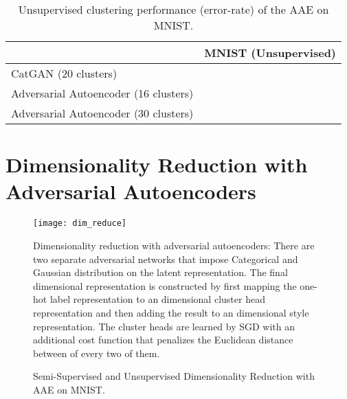 \documentclass{article}
\begin{document}
\begin{center}
\begin{table}[t]
\small
\centering \begin{tabular}{ l  || c}
  \hline
  & MNIST (Unsupervised)\\
  \hline

  CatGAN \citep{catgan}(20 clusters) &   \\  
  Adversarial Autoencoder (16 clusters) &  \\
  Adversarial Autoencoder (30 clusters) &  \\
  \hline
\end{tabular}
\caption{\label{table:cluster}Unsupervised clustering performance (error-rate) of the AAE on MNIST.}
\end{table}
\end{center}


\section{Dimensionality Reduction with Adversarial Autoencoders}\label{dim_reduce}

\begin{figure}[!b]
\begin{center}
\centering 
\texttt{[image: dim\_reduce]}
\caption{\label{fig_2d}Dimensionality reduction with adversarial autoencoders: There are two separate adversarial networks that impose Categorical and Gaussian distribution on the latent representation. The final  dimensional representation is constructed by first mapping the one-hot label representation to an  dimensional cluster head representation and then adding the result to an  dimensional style representation. The cluster heads are learned by SGD with an additional cost function that penalizes the Euclidean distance between of every two of them.}
\end{center}
\end{figure}

\begin{figure}[t]
\centering

\caption{\label{fig:dim}Semi-Supervised and Unsupervised Dimensionality Reduction with AAE on MNIST.}
\end{figure}
\end{document}
